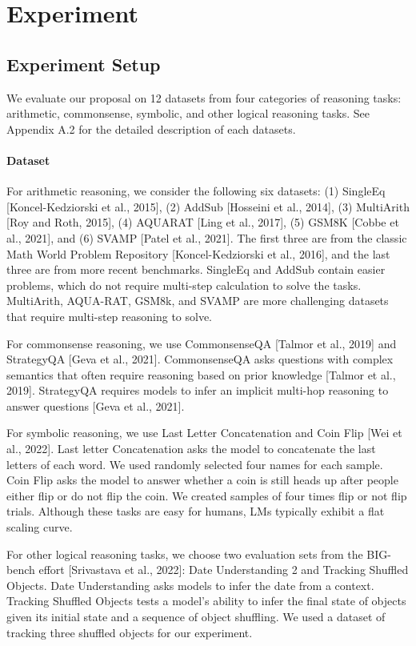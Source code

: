 \documentclass{article}
\begin{document}
\section{Experiment}

\subsection{Experiment Setup}
We evaluate our proposal on 12 datasets from four categories of reasoning tasks: arithmetic, commonsense, symbolic, and other logical reasoning tasks. See Appendix A.2 for the detailed description of each datasets.

\paragraph{Dataset}
For arithmetic reasoning, we consider the following six datasets: (1) SingleEq [Koncel-Kedziorski et al., 2015], (2) AddSub [Hosseini et al., 2014], (3) MultiArith [Roy and Roth, 2015], (4) AQUARAT [Ling et al., 2017], (5) GSM8K [Cobbe et al., 2021], and (6) SVAMP [Patel et al., 2021]. The first three are from the classic Math World Problem Repository [Koncel-Kedziorski et al., 2016], and the last three are from more recent benchmarks. SingleEq and AddSub contain easier problems, which do not require multi-step calculation to solve the tasks. MultiArith, AQUA-RAT, GSM8k, and SVAMP are more challenging datasets that require multi-step reasoning to solve. 

For commonsense reasoning, we use CommonsenseQA [Talmor et al., 2019] and StrategyQA [Geva et al., 2021]. CommonsenseQA asks questions with complex semantics that often require reasoning based on prior knowledge [Talmor et al., 2019]. StrategyQA requires models to infer an implicit multi-hop reasoning to answer questions [Geva et al., 2021].

For symbolic reasoning, we use Last Letter Concatenation and Coin Flip [Wei et al., 2022]. Last letter Concatenation asks the model to concatenate the last letters of each word. We used randomly selected four names for each sample. Coin Flip asks the model to answer whether a coin is still heads up after people either flip or do not flip the coin. We created samples of four times flip or not flip trials. Although these tasks are easy for humans, LMs typically exhibit a flat scaling curve. 

For other logical reasoning tasks, we choose two evaluation sets from the BIG-bench effort [Srivastava et al., 2022]: Date Understanding 2 and Tracking Shuffled Objects. Date Understanding asks models to infer the date from a context. Tracking Shuffled Objects tests a model’s ability to infer the final state of objects given its initial state and a sequence of object shuffling. We used a dataset of tracking three shuffled objects for our experiment.
\end{document}
